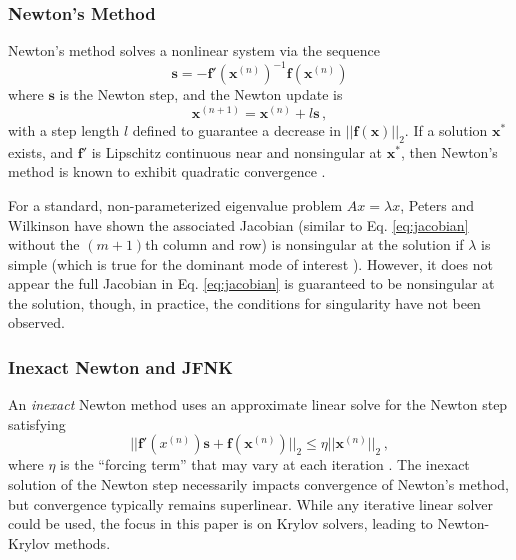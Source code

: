 \subsubsection{Newton's Method}

Newton's method \cite{kelley1995iml} solves a nonlinear system 
via the sequence
\begin{equation}
 \mathbf{s} = -\mathbf{f}'(\mathbf{x}^{(n)})^{-1} \mathbf{f}(\mathbf{x}^{(n)})
 \label{eq:newtonstep}
\end{equation}
where $\mathbf{s}$ is the Newton step, and the Newton update is
\begin{equation}
 \mathbf{x}^{(n+1)} = \mathbf{x}^{(n)} + l \mathbf{s} \, ,
 \label{eq:newtonupdate}
\end{equation}
with a step length $l$ defined to guarantee a decrease in 
$||\mathbf{f(x)}||_2$.  If a solution $\mathbf{x}^*$ exists, 
and $\mathbf{f}'$ is Lipschitz continuous near and nonsingular 
at $\mathbf{x}^*$, then Newton's method is known to exhibit 
quadratic convergence \cite{kelley1995iml}.  

For a standard, non-parameterized eigenvalue 
problem $Ax = \lambda x$, Peters and Wilkinson \cite{peters1979iii} 
have shown the associated Jacobian (similar to Eq. \ref{eq:jacobian} 
without the  $(m+1)$th column and row) is nonsingular at the 
solution if $\lambda$ is simple (which is true for the dominant 
mode of interest \cite{lindahl1981rrm}).  However, it does not 
appear the full Jacobian in 
Eq. \ref{eq:jacobian} is guaranteed to be nonsingular at the 
solution, though, in practice, the conditions for 
singularity have not been observed.

\subsubsection{Inexact Newton and JFNK}

An {\it inexact} Newton method uses an approximate linear solve for 
the Newton step satisfying 
\begin{equation}
 || \mathbf{f}'({x}^{(n)}) \mathbf{s} + \mathbf{f}(\mathbf{x}^{(n)}) ||_2  
   \le \eta || \mathbf{x}^{(n)} ||_2 \, ,
 \label{eq:inexactnewtonstep}
\end{equation}
where $\eta$ is the ``forcing term'' that may vary at each 
iteration \cite{kelley1995iml}. 
The inexact solution of the Newton step necessarily 
impacts convergence of Newton's method, but  convergence  typically
remains superlinear.  While any iterative linear solver could 
be used, the focus in this paper is on Krylov solvers,
leading to Newton-Krylov methods.

